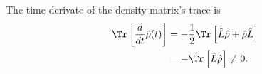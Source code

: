 
The time derivate of the density matrix's trace is
\begin{equation}
    \begin{split}
        \Tr\left[\frac{d}{dt}\hat\rho(t)\right] &= -\frac{1}{2}\Tr\left[\hat L \hat \rho + \hat \rho \hat L\right]\\
        &=-\Tr\left[\hat L \hat \rho\right] \neq 0.
    \end{split}
\end{equation}


